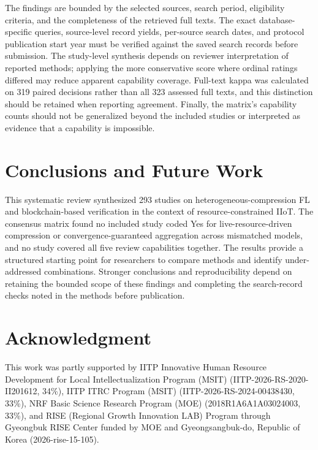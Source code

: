\documentclass[journal]{IEEEtran}
\begin{document}
The findings are bounded by the selected sources, search period, eligibility criteria, and the completeness of the retrieved full texts. The exact database-specific queries, source-level record yields, per-source search dates, and protocol publication start year must be verified against the saved search records before submission. The study-level synthesis depends on reviewer interpretation of reported methods; applying the more conservative score where ordinal ratings differed may reduce apparent capability coverage. Full-text kappa was calculated on 319 paired decisions rather than all 323 assessed full texts, and this distinction should be retained when reporting agreement. Finally, the matrix's capability counts should not be generalized beyond the included studies or interpreted as evidence that a capability is impossible.

\section{Conclusions and Future Work}
\label{sec:conclusion}

This systematic review synthesized 293 studies on heterogeneous-compression FL and blockchain-based verification in the context of resource-constrained IIoT. The consensus matrix found no included study coded Yes for live-resource-driven compression or convergence-guaranteed aggregation across mismatched models, and no study covered all five review capabilities together. The results provide a structured starting point for researchers to compare methods and identify under-addressed combinations. Stronger conclusions and reproducibility depend on retaining the bounded scope of these findings and completing the search-record checks noted in the methods before publication.

\section*{Acknowledgment}
This work was partly supported by IITP Innovative Human Resource Development for Local Intellectualization Program (MSIT) (IITP-2026-RS-2020-II201612, 34\%), IITP ITRC Program (MSIT) (IITP-2026-RS-2024-00438430, 33\%), NRF Basic Science Research Program (MOE) (2018R1A6A1A03024003, 33\%), and RISE (Regional Growth Innovation LAB) Program through Gyeongbuk RISE Center funded by MOE and Gyeongsangbuk-do, Republic of Korea (2026-rise-15-105).

\balance


\end{document}
